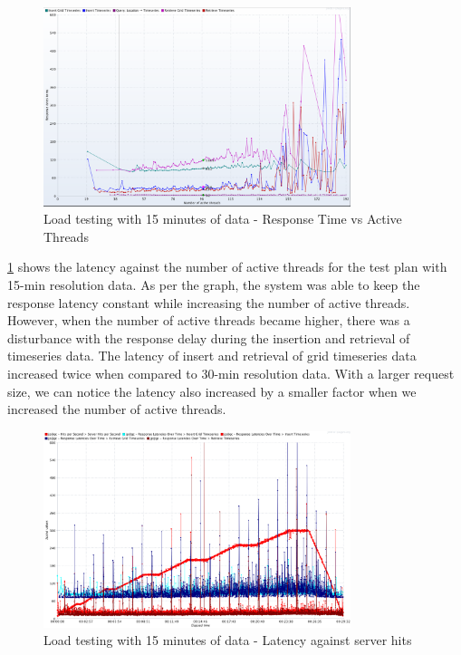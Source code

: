 \begin{figure}[htp]
    \centering
    \includegraphics[width=0.8\textwidth]{results/obs/all/obs_all_15m_response_times_vs_threads.png}
    \caption{Load testing with 15 minutes of data - Response Time vs Active Threads}
    \label{fi:test_obs_all_15m_response_vs_threads}
\end{figure}

\cref{fi:test_obs_all_15m_response_vs_threads} shows the latency against the number of active threads for the test plan with 15-min resolution data. As per the graph, the system was able to keep the response latency constant while increasing the number of active threads. However, when the number of active threads became higher, there was a disturbance with the response delay during the insertion and retrieval of timeseries data. The latency of insert and retrieval of grid timeseries data increased twice when compared to 30-min resolution data. With a larger request size, we can notice the latency also increased by a smaller factor when we increased the number of active threads. 

\begin{figure}[htp]
    \centering
    \includegraphics[width=0.8\textwidth]{results/obs/all/obs_all_15m_res_latencies_against_hits.png}
    \caption{Load testing with 15 minutes of data - Latency against server hits}
    \label{fi:test_obs_all_15m_latency}
\end{figure}

